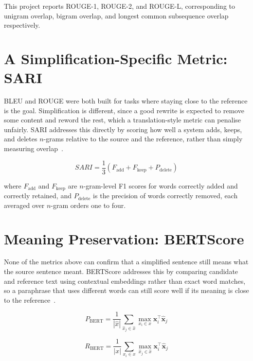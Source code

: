 This project reports ROUGE-1, ROUGE-2, and ROUGE-L, corresponding to unigram overlap, bigram overlap, and longest common subsequence overlap respectively.

\section{A Simplification-Specific Metric: SARI}
\label{sec:sari-metric}

BLEU and ROUGE were both built for tasks where staying close to the reference is the goal. Simplification is different, since a good rewrite is expected to remove some content and reword the rest, which a translation-style metric can penalise unfairly. SARI addresses this directly by scoring how well a system adds, keeps, and deletes $n$-grams relative to the source and the reference, rather than simply measuring overlap~\cite{xu2016sari}.

\begin{equation}
    \label{eq:sari}
    SARI = \frac{1}{3} \left( F_{\text{add}} + F_{\text{keep}} + P_{\text{delete}} \right)
\end{equation}

where $F_{\text{add}}$ and $F_{\text{keep}}$ are $n$-gram-level F1 scores for words correctly added and correctly retained, and $P_{\text{delete}}$ is the precision of words correctly removed, each averaged over $n$-gram orders one to four.

\section{Meaning Preservation: BERTScore}
\label{sec:bertscore-metric}

None of the metrics above can confirm that a simplified sentence still means what the source sentence meant. BERTScore addresses this by comparing candidate and reference text using contextual embeddings rather than exact word matches, so a paraphrase that uses different words can still score well if its meaning is close to the reference~\cite{zhang2020bertscore}.

\begin{equation}
    \label{eq:bertscore-p}
    P_{\text{BERT}} = \frac{1}{|\hat{x}|} \sum_{\hat{x}_j \in \hat{x}} \max_{x_i \in x} \mathbf{x}_i^{\top} \hat{\mathbf{x}}_j
\end{equation}

\begin{equation}
    \label{eq:bertscore-r}
    R_{\text{BERT}} = \frac{1}{|x|} \sum_{x_i \in x} \max_{\hat{x}_j \in \hat{x}} \mathbf{x}_i^{\top} \hat{\mathbf{x}}_j
\end{equation}

